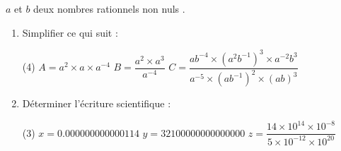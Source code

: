 \documentclass[a4paper,12pt]{article}
\begin{document}
\begin{exo}
$a$ et $b$ deux nombres rationnels non nuls .
\begin{enumerate}
\item Simplifier ce qui suit :
\begin{EnvFullwidth}
\begin{tasks}[style=itemize](4)
\task $A=a^{2}\times a \times a^{-4} $ 
\task $B=\dfrac{a^{2}\times a^{3}}{a^{-4}}$
\task* $C=\dfrac{ab^{-4}\times (a^{2}b^{-1})^{3}\times a^{-2}b^{3}}{a^{-5}\times (ab^{-1})^{2}\times (ab)^{3}}$
\end{tasks}
\end{EnvFullwidth}
\item Déterminer l'écriture scientifique : 
\begin{EnvFullwidth}
\begin{tasks}[style=itemize](3)
\task $x=0.000000000000114$
\task $y=32100000000000000$
\task $z=\dfrac{14\times 10^{14}\times 10^{-8}}{5\times 10^{-12}\times 10^{20}}$
\end{tasks}
\end{EnvFullwidth}
\end{enumerate}
\end{exo}
\end{document}
